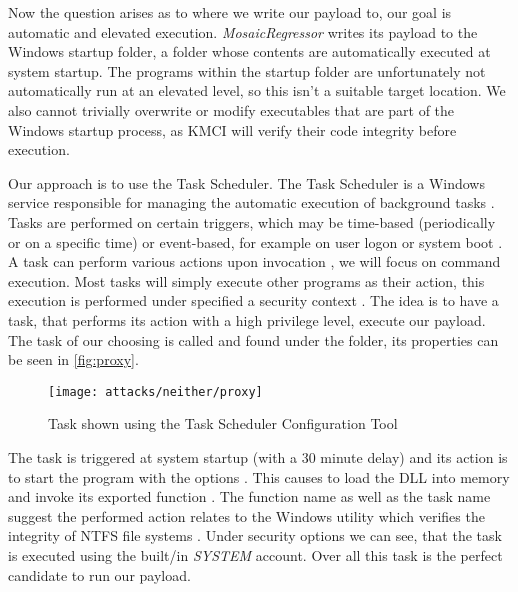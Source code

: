 Now the question arises as to where we write our payload to, our goal is automatic and elevated execution.
\emph{MosaicRegressor} writes its payload to the Windows startup folder, a folder whose contents are automatically executed at system startup.
The programs within the startup folder are unfortunately not automatically run at an elevated level, so this isn't a suitable target location.
We also cannot trivially overwrite or modify executables that are part of the Windows startup process, as \ac{KMCI} will verify their code integrity before execution.

Our approach is to use the Task Scheduler.
The Task Scheduler is a Windows service responsible for managing the automatic execution of background tasks \cite[Section 10]{windows-internals-7-part2}.
Tasks are performed on certain triggers, which may be time-based (periodically or on a specific time) or event-based, for example on user logon or system boot \cite{microsoft-task-scheduler-triggers}.
A task can perform various actions upon invocation \cite{microsoft-task-scheduler-actions}, we will focus on command execution.
Most tasks will simply execute other programs as their action, this execution is performed under specified a security context \cite{microsoft-task-scheduler-security-contexts}.
The idea is to have a task, that performs its action with a high privilege level, execute our payload.
The task of our choosing is called  and found under the  folder, its properties can be seen in \autoref{fig:proxy}.

\begin{figure}[htb]
    \centering
    \texttt{[image: attacks/neither/proxy]}
    \caption{ Task shown using the Task Scheduler Configuration Tool}
    \label{fig:proxy}
\end{figure}

The  task is triggered at system startup (with a 30 minute delay) and its action is to start the program  with the options .
This causes  to load the  \ac{DLL} into memory and invoke its exported function  \cite{microsoft-rundll32}.
The function name as well as the task name suggest the performed action relates to the Windows utility  which verifies the integrity of \ac{NTFS} file systems \cite{microsoft-autochk}.
Under security options we can see, that the task is executed using the built\-/in \emph{SYSTEM} account.
Over all this task is the perfect candidate to run our payload.

